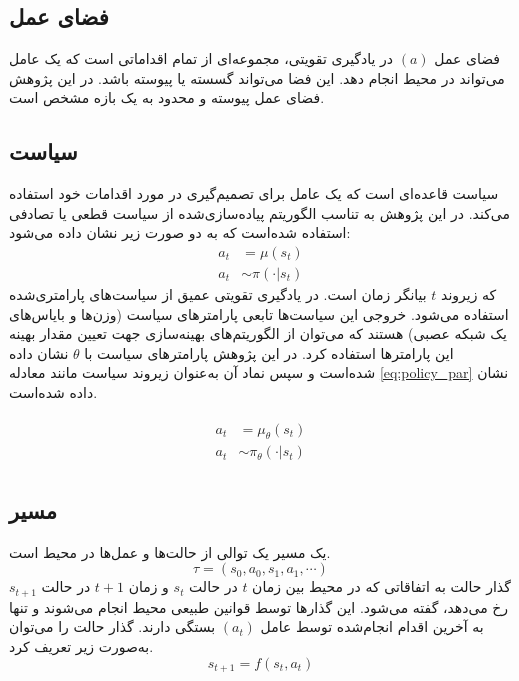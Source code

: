 \subsection{فضای عمل}
فضای عمل \((a)\) در یادگیری تقویتی، مجموعه‌ای از تمام اقداماتی است که یک عامل می‌تواند در محیط انجام دهد. این فضا می‌تواند گسسته یا پیوسته باشد. در این پژوهش فضای عمل پیوسته و محدود به یک بازه مشخص است.
\subsection{سیاست}
سیاست
  قاعده‌ای است که یک عامل برای تصمیم‌گیری در مورد اقدامات خود استفاده می‌کند. در این پژوهش به تناسب الگوریتم پیاده‌سازی‌شده از سیاست قطعی
 یا تصادفی
  استفاده شده‌است که به دو صورت زیر  نشان داده می‌شود:
  \begin{align}
  	a_t &= \mu(s_t)\\
  	a_t & \sim \pi(\cdot | s_t)
  \end{align}
  که زیروند \(t\)
   بیانگر زمان است.
  در یادگیری تقویتی عمیق از سیاست‌های پارامتری‌شده استفاده می‌شود. خروجی‌ این سیاست‌ها تابعی پارامترهای سیاست (وزن‌ها و بایاس‌های یک شبکه عصبی) هستند که می‌توان از الگوریتم‌های بهینه‌سازی جهت تعیین مقدار بهینه این پارامترها استفاده کرد.
  در این پژوهش پارامترهای سیاست با \( \theta\) نشان داده شده‌است و سپس نماد آن به‌عنوان زیروند سیاست مانند معادله \eqref{eq:policy_par} نشان داده شده‌است.
  
\begin{align}
	 \begin{split} 	 
 	a_t &= \mu_{\theta}(s_t) \\
 		a_t & \sim \pi_{\theta}(\cdot | s_t)
 	 \end{split}
 	 	\label{eq:policy_par}
\end{align}
\subsection{مسیر}
یک مسیر
 یک توالی از حالت‌ها و عمل‌ها در محیط است.
 \begin{equation}
		 \tau = (s_0, a_0, s_1, a_1, \cdots)
 \end{equation}
  گذار حالت
   به اتفاقاتی که در محیط بین 
   زمان \(t\)
   در حالت \(s_t\)
   و
      زمان
       \(t+1\)
   در حالت
    \(s_{t+1}\)
   رخ می‌دهد، گفته می‌شود. این گذارها توسط قوانین طبیعی محیط انجام می‌شوند و تنها به آخرین اقدام انجام‌شده توسط عامل \((a_t)\) بستگی دارند. گذار حالت را می‌توان به‌صورت زیر تعریف کرد.
   \begin{equation}
   	s_{t+1} = f(s_t, a_t)
   \end{equation}
  
